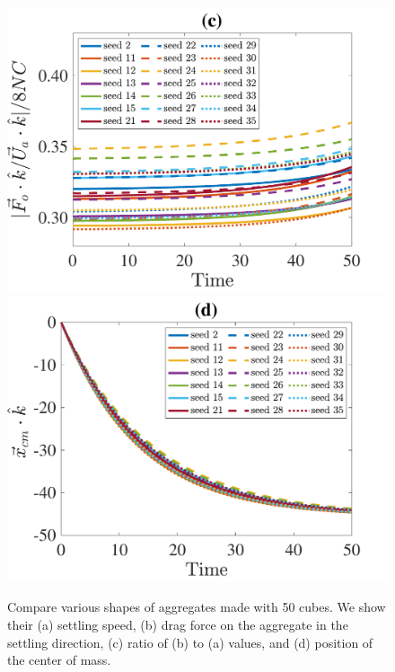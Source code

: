 \begin{figure}[ht]
\begin{center}
		\includegraphics[scale=0.29]{./figures/fig_NC50_sd_Fo3Ua_ratio}
		\includegraphics[scale=0.29]{./figures/fig_NC50_sd_cm3_all}
	\caption{Compare various shapes of aggregates made with 50 cubes. We show their (a) settling speed, (b) drag force on the aggregate in the settling direction, (c) ratio of (b) to (a) values, and (d) position of the center of mass.}
	\label{fig_NC50_Seeds}
\end{center}
\end{figure}
\par

